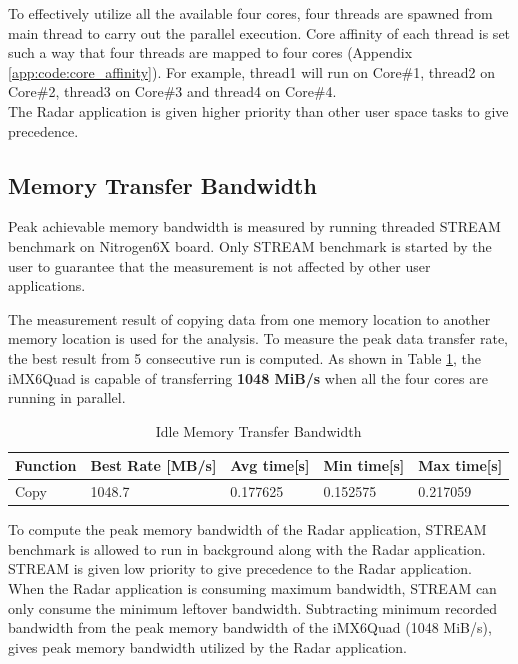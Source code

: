 To effectively utilize all the available four cores, four threads are spawned from main thread to carry out the parallel execution. Core affinity of each thread is set such a way that four threads are mapped to four cores (Appendix \ref{app:code:core_affinity}). For example, thread1 will run on Core\#1, thread2 on Core\#2, thread3 on Core\#3 and thread4 on Core\#4.\\
The Radar application is given higher priority than other user space tasks to give precedence. 

\subsection{Memory Transfer Bandwidth}
\label{ss:mm:mem_bw}
Peak achievable memory bandwidth is measured by running threaded STREAM benchmark on Nitrogen6X board. Only STREAM benchmark is started by the user to guarantee that the measurement is not affected by other user applications. 


The measurement result of copying data from one memory location to another memory location is used for the  analysis. To measure the peak data transfer rate, the best result from 5 consecutive run is computed. As shown in Table \ref{tbl:mm:bw_no_load}, the iMX6Quad is capable of transferring \textbf{1048 MiB/s} when all the four cores are running in parallel.\\

\begin{table}[h!]
	\centering
	\begin{tabular}{|l|l|l|l|l|} 
	 \hline
	 \textbf{Function} & \textbf{Best Rate [MB/s]} & \textbf{Avg time[s]} & \textbf{Min time[s]} & \textbf{Max time[s]} \\
	 \hline
	 Copy & 1048.7 & 0.177625 & 0.152575 & 0.217059 \\ \hline
	\end{tabular}
	\caption{Idle Memory Transfer Bandwidth}
	\label{tbl:mm:bw_no_load}
\end{table}

To compute the peak memory bandwidth of the Radar application, STREAM benchmark is allowed to run in background along with the Radar application. STREAM is given low priority to give precedence to the Radar application. When the Radar application is consuming maximum bandwidth, STREAM can only consume the minimum leftover bandwidth. Subtracting minimum recorded bandwidth from the peak memory bandwidth of the iMX6Quad (1048 MiB/s), gives peak memory bandwidth utilized by the Radar application.

